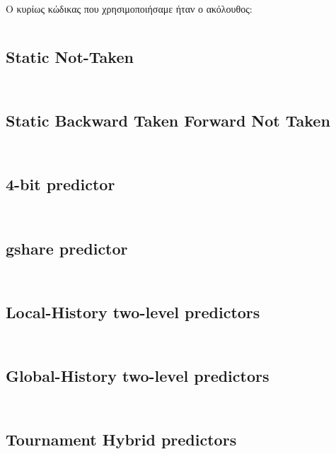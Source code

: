 \documentclass[a4paper,12pt]{article}
\begin{document}
Ο κυρίως κώδικας που χρησιμοποιήσαμε ήταν ο ακόλουθος:
\inputminted[linenos,fontsize=\scriptsize,frame=leftline]{cpp}{files/src-C1-predict.cpp}
\subsection*{Static Not-Taken}
\inputminted[linenos,fontsize=\scriptsize,frame=leftline]{cpp}{files/src-C1-nt_predictor.h}
\inputminted[linenos,fontsize=\scriptsize,frame=leftline]{cpp}{files/src-C1-nt_predictor.cpp}
\subsection*{Static Backward Taken Forward Not Taken}
\inputminted[linenos,fontsize=\scriptsize,frame=leftline]{cpp}{files/src-C1-btfnt_predictor.h}
\inputminted[linenos,fontsize=\scriptsize,frame=leftline]{cpp}{files/src-C1-btfnt_predictor.cpp}
\subsection*{4-bit predictor}
\inputminted[linenos,fontsize=\scriptsize,frame=leftline]{cpp}{files/src-C1-nbit_predictor.h}
\inputminted[linenos,fontsize=\scriptsize,frame=leftline]{cpp}{files/src-C1-nbit_predictor.cpp}
\subsection*{gshare predictor}
\inputminted[linenos,fontsize=\scriptsize,frame=leftline]{cpp}{files/src-C1-gshare_predictor.h}
\inputminted[linenos,fontsize=\scriptsize,frame=leftline]{cpp}{files/src-C1-gshare_predictor.cpp}
\subsection*{Local-History two-level predictors}
\inputminted[linenos,fontsize=\scriptsize,frame=leftline]{cpp}{files/src-C1-localhistory_predictor.h}
\inputminted[linenos,fontsize=\scriptsize,frame=leftline]{cpp}{files/src-C1-localhistory_predictor.cpp}
\subsection*{Global-History two-level predictors}
\inputminted[linenos,fontsize=\scriptsize,frame=leftline]{cpp}{files/src-C1-globalhistory_predictor.h}
\inputminted[linenos,fontsize=\scriptsize,frame=leftline]{cpp}{files/src-C1-globalhistory_predictor.cpp}
\subsection*{Tournament Hybrid predictors}
\inputminted[linenos,fontsize=\scriptsize,frame=leftline]{cpp}{files/src-C1-hybrid_predictor.h}
\inputminted[linenos,fontsize=\scriptsize,frame=leftline]{cpp}{files/src-C1-hybrid_predictor.cpp}


\end{document}
